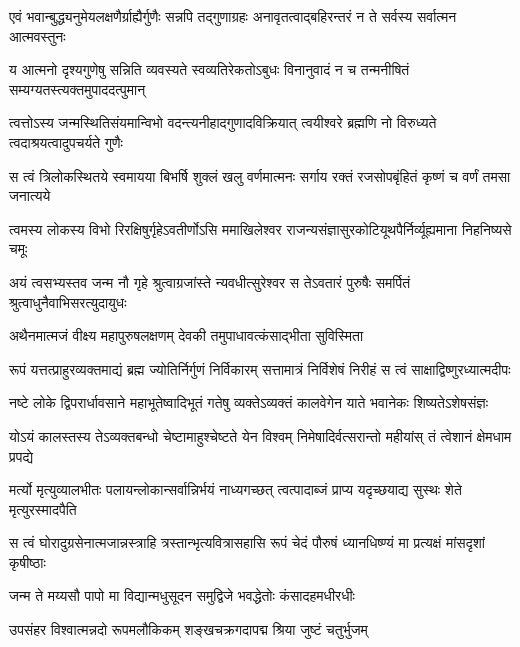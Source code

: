 \twolineshloka
{एवं भवान्बुद्ध्यनुमेयलक्षणैर्ग्राह्यैर्गुणैः सन्नपि तद्गुणाग्रहः}
{अनावृतत्वाद्बहिरन्तरं न ते सर्वस्य सर्वात्मन आत्मवस्तुनः} %

\twolineshloka
{य आत्मनो दृश्यगुणेषु सन्निति व्यवस्यते स्वव्यतिरेकतोऽबुधः}
{विनानुवादं न च तन्मनीषितं सम्यग्यतस्त्यक्तमुपाददत्पुमान्} %

\fourlineindentedshloka
{त्वत्तोऽस्य जन्मस्थितिसंयमान्विभो}
{वदन्त्यनीहादगुणादविक्रियात्}
{त्वयीश्वरे ब्रह्मणि नो विरुध्यते}
{त्वदाश्रयत्वादुपचर्यते गुणैः} %

\fourlineindentedshloka
{स त्वं त्रिलोकस्थितये स्वमायया}
{बिभर्षि शुक्लं खलु वर्णमात्मनः}
{सर्गाय रक्तं रजसोपबृंहितं}
{कृष्णं च वर्णं तमसा जनात्यये} %

\twolineshloka
{त्वमस्य लोकस्य विभो रिरक्षिषुर्गृहेऽवतीर्णोऽसि ममाखिलेश्वर}
{राजन्यसंज्ञासुरकोटियूथपैर्निर्व्यूह्यमाना निहनिष्यसे चमूः} %

\fourlineindentedshloka
{अयं त्वसभ्यस्तव जन्म नौ गृहे}
{श्रुत्वाग्रजांस्ते न्यवधीत्सुरेश्वर}
{स तेऽवतारं पुरुषैः समर्पितं}
{श्रुत्वाधुनैवाभिसरत्युदायुधः} %



\twolineshloka
{अथैनमात्मजं वीक्ष्य महापुरुषलक्षणम्}
{देवकी तमुपाधावत्कंसाद्भीता सुविस्मिता} %



\fourlineindentedshloka
{रूपं यत्तत्प्राहुरव्यक्तमाद्यं}
{ब्रह्म ज्योतिर्निर्गुणं निर्विकारम्}
{सत्तामात्रं निर्विशेषं निरीहं}
{स त्वं साक्षाद्विष्णुरध्यात्मदीपः} %

\twolineshloka
{नष्टे लोके द्विपरार्धावसाने महाभूतेष्वादिभूतं गतेषु}
{व्यक्तेऽव्यक्तं कालवेगेन याते भवानेकः शिष्यतेऽशेषसंज्ञः} %

\fourlineindentedshloka
{योऽयं कालस्तस्य तेऽव्यक्तबन्धो}
{चेष्टामाहुश्चेष्टते येन विश्वम्}
{निमेषादिर्वत्सरान्तो महीयांस्}
{तं त्वेशानं क्षेमधाम प्रपद्ये} %

\twolineshloka
{मर्त्यो मृत्युव्यालभीतः पलायन्लोकान्सर्वान्निर्भयं नाध्यगच्छत्}
{त्वत्पादाब्जं प्राप्य यदृच्छयाद्य सुस्थः शेते मृत्युरस्मादपैति} %

\twolineshloka
{स त्वं घोरादुग्रसेनात्मजान्नस्त्राहि त्रस्तान्भृत्यवित्रासहासि}
{रूपं चेदं पौरुषं ध्यानधिष्ण्यं मा प्रत्यक्षं मांसदृशां कृषीष्ठाः} %

\twolineshloka
{जन्म ते मय्यसौ पापो मा विद्यान्मधुसूदन}
{समुद्विजे भवद्धेतोः कंसादहमधीरधीः} %

\twolineshloka
{उपसंहर विश्वात्मन्नदो रूपमलौकिकम्}
{शङ्खचक्रगदापद्म श्रिया जुष्टं चतुर्भुजम्} %

